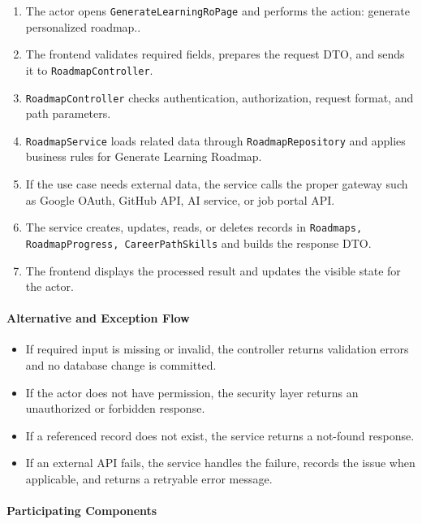 \begin{enumerate}
    \item The actor opens \texttt{GenerateLearningRoPage} and performs the action: generate personalized roadmap..
    \item The frontend validates required fields, prepares the request DTO, and sends it to \texttt{RoadmapController}.
    \item \texttt{RoadmapController} checks authentication, authorization, request format, and path parameters.
    \item \texttt{RoadmapService} loads related data through \texttt{RoadmapRepository} and applies business rules for Generate Learning Roadmap.
    \item If the use case needs external data, the service calls the proper gateway such as Google OAuth, GitHub API, AI service, or job portal API.
    \item The service creates, updates, reads, or deletes records in \texttt{Roadmaps, RoadmapProgress, CareerPathSkills} and builds the response DTO.
    \item The frontend displays the processed result and updates the visible state for the actor.
\end{enumerate}

\paragraph{Alternative and Exception Flow}

\begin{itemize}
    \item If required input is missing or invalid, the controller returns validation errors and no database change is committed.
    \item If the actor does not have permission, the security layer returns an unauthorized or forbidden response.
    \item If a referenced record does not exist, the service returns a not-found response.
    \item If an external API fails, the service handles the failure, records the issue when applicable, and returns a retryable error message.
\end{itemize}

\paragraph{Participating Components}

